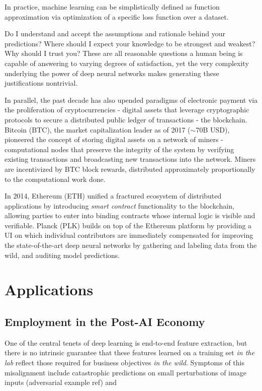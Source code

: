 \documentclass[12pt]{article}
\begin{document}
In practice, machine learning can be simplistically defined as function approximation via optimization of a specific loss function over a dataset.   

Do I understand and accept the assumptions and rationale behind your predictions?  Where should I expect your knowledge to be strongest and weakest?  Why should I trust you?  These are all reasonable questions a human being is capable of answering to varying degrees of satisfaction, yet the very complexity underlying the power of deep neural networks makes generating these justifications nontrivial.  

In parallel, the past decade has also upended paradigms of electronic payment via the proliferation of cryptocurrencies -  digital assets that leverage cryptographic protocols to secure a distributed public ledger of transactions - the blockchain.  Bitcoin (BTC), the market capitalization leader as of 2017 ($\sim$70B USD), pioneered the concept of storing digital assets on a network of miners - computational nodes that preserve the integrity of the system by verifying existing transactions and broadcasting new transactions into the network.  Miners are incentivized by BTC block rewards, distributed approximately proportionally to the computational work done.

In 2014, Ethereum (ETH) unified a fractured ecosystem of distributed applications by introducing \emph{smart contract} functionality to the blockchain, allowing parties to enter into binding contracts whose internal logic is visible and verifiable.  Planck (PLK) builds on top of the Ethereum platform by providing a UI on which individual contributors are immediately compensated for improving the state-of-the-art deep neural networks by gathering and labeling data from the wild, and auditing model predictions.

\section{Applications}
\subsection{Employment in the Post-AI Economy}

One of the central tenets of deep learning is end-to-end feature extraction, but there is no intrinsic guarantee that these features learned on a training set \emph{in the lab} reflect those required for business objectives \emph{in the wild}.  Symptoms of this misalignment include catastrophic predictions on small perturbations of image inputs (adversarial example ref) and 
\end{document}
